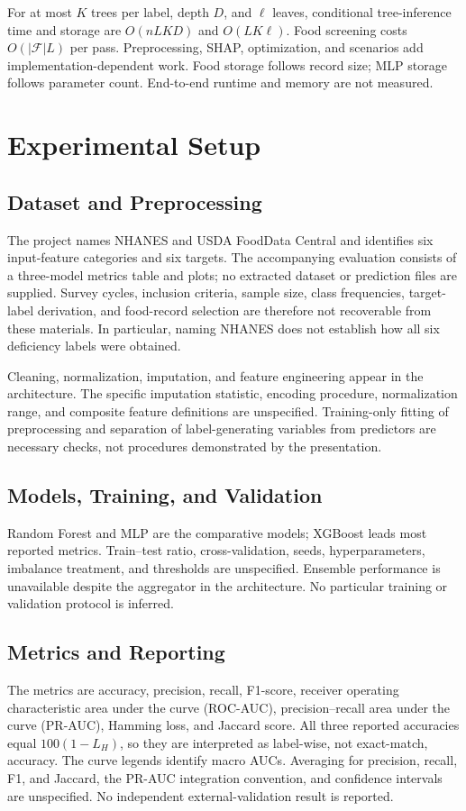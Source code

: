\documentclass[conference]{IEEEtran}
\begin{document}
For at most $K$ trees per label, depth $D$, and $\ell$ leaves, conditional tree-inference time and storage are $O(nLKD)$ and $O(LK\ell)$. Food screening costs $O(|\mathcal{F}|L)$ per pass. Preprocessing, SHAP, optimization, and scenarios add implementation-dependent work. Food storage follows record size; MLP storage follows parameter count. End-to-end runtime and memory are not measured.

\section{Experimental Setup}

\subsection{Dataset and Preprocessing}
The project names NHANES and USDA FoodData Central and identifies six input-feature categories and six targets. The accompanying evaluation consists of a three-model metrics table and plots; no extracted dataset or prediction files are supplied. Survey cycles, inclusion criteria, sample size, class frequencies, target-label derivation, and food-record selection are therefore not recoverable from these materials. In particular, naming NHANES does not establish how all six deficiency labels were obtained.

Cleaning, normalization, imputation, and feature engineering appear in the architecture. The specific imputation statistic, encoding procedure, normalization range, and composite feature definitions are unspecified. Training-only fitting of preprocessing and separation of label-generating variables from predictors are necessary checks, not procedures demonstrated by the presentation.

\subsection{Models, Training, and Validation}
Random Forest and MLP are the comparative models; XGBoost leads most reported metrics. Train--test ratio, cross-validation, seeds, hyperparameters, imbalance treatment, and thresholds are unspecified. Ensemble performance is unavailable despite the aggregator in the architecture. No particular training or validation protocol is inferred.

\subsection{Metrics and Reporting}
The metrics are accuracy, precision, recall, F1-score, receiver operating characteristic area under the curve (ROC-AUC), precision--recall area under the curve (PR-AUC), Hamming loss, and Jaccard score. All three reported accuracies equal $100(1 - L_H)$, so they are interpreted as label-wise, not exact-match, accuracy. The curve legends identify macro AUCs. Averaging for precision, recall, F1, and Jaccard, the PR-AUC integration convention, and confidence intervals are unspecified. No independent external-validation result is reported.
\end{document}
